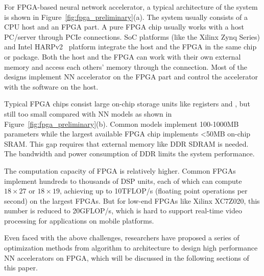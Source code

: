 For FPGA-based neural network accelerator, a typical architecture of the system is shown in Figure~\ref{fig:fpga_preliminary}(a). The system usually consists of a CPU host and an FPGA part. A pure FPGA chip usually works with a host PC/server through PCIe connections. SoC platforms (like the Xilinx Zynq Series) and Intel HARPv2~\cite{gupta2016accelerating} platform integrate the host and the FPGA in the same chip or package. Both the host and the FPGA can work with their own external memory and access each others' memory through the connection. Most of the designs implement NN accelerator on the FPGA part and control the 
accelerator with the software on the host.

Typical FPGA chips consist large on-chip storage units like registers and , but still too small compared with NN models as shown in Figure~\ref{fig:fpga_preliminary}(b). Common models implement 100-1000MB parameters while the largest available FPGA chip implements <50MB on-chip SRAM. This gap requires that external memory like DDR SDRAM is needed. The bandwidth and power consumption of DDR limits the system performance.

The computation capacity of FPGA is relatively higher. Common FPGAs implement hundreds to thousands of DSP units, each of which can compute $18\times 27$ or $18\times 19$, achieving up to 10TFLOP/s (floating point operations per second) on the largest FPGAs. But for low-end FPGAs like Xilinx XC7Z020, this number is reduced to 20GFLOP/s, which is hard to support real-time video processing for applications on mobile platforms. 

Even faced with the above challenges, researchers have proposed a series of optimization methods from algorithm to architecture to design high performance NN accelerators on FPGA, which will be discussed in the following sections of this paper.